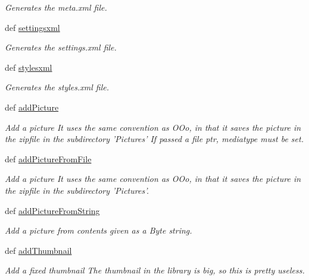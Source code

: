 \begin{DoxyCompactItemize}
\begin{DoxyCompactList}\small\item\em Generates the meta.\+xml file. \end{DoxyCompactList}\item 
def \hyperlink{classodf_1_1opendocument_1_1OpenDocument_ad041c8957e3d1fb00db0643fb4d5b399}{settingsxml}
\begin{DoxyCompactList}\small\item\em Generates the settings.\+xml file. \end{DoxyCompactList}\item 
def \hyperlink{classodf_1_1opendocument_1_1OpenDocument_a7fcbbb5a8bc61a58bc73aad249c06dba}{stylesxml}
\begin{DoxyCompactList}\small\item\em Generates the styles.\+xml file. \end{DoxyCompactList}\item 
def \hyperlink{classodf_1_1opendocument_1_1OpenDocument_a0ffd8330bd063b20fc1448a126d6c47e}{add\+Picture}
\begin{DoxyCompactList}\small\item\em Add a picture It uses the same convention as O\+Oo, in that it saves the picture in the zipfile in the subdirectory 'Pictures' If passed a file ptr, mediatype must be set. \end{DoxyCompactList}\item 
def \hyperlink{classodf_1_1opendocument_1_1OpenDocument_ab6fbce967bcee9fc66406a2946798140}{add\+Picture\+From\+File}
\begin{DoxyCompactList}\small\item\em Add a picture It uses the same convention as O\+Oo, in that it saves the picture in the zipfile in the subdirectory 'Pictures'. \end{DoxyCompactList}\item 
def \hyperlink{classodf_1_1opendocument_1_1OpenDocument_a3f01f9e2ca8eeef0a8afeb5e0cece2e1}{add\+Picture\+From\+String}
\begin{DoxyCompactList}\small\item\em Add a picture from contents given as a Byte string. \end{DoxyCompactList}\item 
def \hyperlink{classodf_1_1opendocument_1_1OpenDocument_a500d446188174d628ba2ab9c4353769c}{add\+Thumbnail}
\begin{DoxyCompactList}\small\item\em Add a fixed thumbnail The thumbnail in the library is big, so this is pretty useless. \end{DoxyCompactList}\item 

\end{DoxyCompactItemize}
